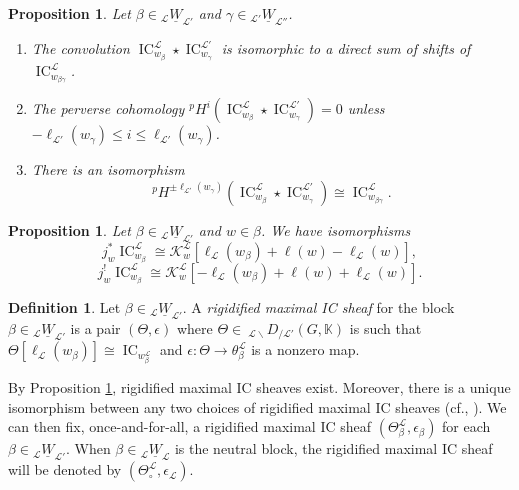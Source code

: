\documentclass{amsart}
\newcommand{\K}{\mathbb{K}}
\newcommand{\scrK}{\mathcal{K}}
\newcommand{\scrL}{\mathcal{L}}
\DeclareMathOperator{\IC}{IC}
\newcommand{\DEE}[2]{\:_{#1 \backslash} D_{/ #2} }
\newcommand{\uW}[2]{{}_{#1}\underline{W}_{#2}}
\newtheorem{proposition}[subsubsection]{Proposition}
\theoremstyle{definition}
\newtheorem{definition}[subsubsection]{Definition}
\numberwithin{equation}{subsection}
\begin{document}
\begin{proposition}\label{prop:conv_of_max_ICs}
    Let $\beta \in \uW{\scrL}{\scrL'}$ and $\gamma \in \uW{\scrL'}{\scrL''}$.
    \begin{enumerate}
        \item The convolution $\IC_{w_{\beta}}^{\scrL} \star \IC_{w_{\gamma}}^{\scrL'}$ is isomorphic to a direct sum of shifts of $\IC_{w_{\beta \gamma}}^{\scrL}$.
        \item The perverse cohomology ${}^p H^i \left( \IC_{w_{\beta}}^{\scrL} \star \IC_{w_{\gamma}}^{\scrL'} \right) = 0$ unless $-\ell_{\scrL'} (w_{\gamma}) \leq i \leq \ell_{\scrL'} (w_{\gamma})$.
        \item There is an isomorphism
        \[{}^p H^{\pm \ell_{\scrL'} (w_{\gamma})} \left( \IC_{w_{\beta}}^{\scrL} \star \IC_{w_{\gamma}}^{\scrL'} \right) \cong \IC_{w_{\beta \gamma}}^{\scrL}.\]
    \end{enumerate}
\end{proposition}

\begin{proposition}\label{prop:stalks_of_max_ICs}
    Let $\beta \in \uW{\scrL}{\scrL'}$ and $w \in \beta$. We have isomorphisms
    \[ j_w^* \IC_{w_{\beta}}^{\scrL} \cong \scrK_w^{\scrL} [\ell_{\scrL} (w_{\beta}) + \ell (w) - \ell_{\scrL} (w)],\]
    \[ j_w^! \IC_{w_{\beta}}^{\scrL} \cong \scrK_w^{\scrL} [-\ell_{\scrL} (w_{\beta}) + \ell (w) + \ell_{\scrL} (w)].\]
\end{proposition}

\begin{definition}
    Let $\beta \in \uW{\scrL}{\scrL'}$.
    A \emph{rigidified maximal IC sheaf} for the block $\beta \in \uW{\scrL}{\scrL'}$ is a pair $(\Theta, \epsilon)$ where $\Theta \in \DEE{\scrL}{\scrL'} (G, \K)$ is such that $\Theta [\ell_{\scrL} (w_{\beta})] \cong \IC_{w_{\beta}^{\scrL}}$ and $\epsilon : \Theta \to \theta_{\beta}^{\scrL}$ is a nonzero map.
\end{definition}

By Proposition \ref{prop:stalks_of_max_ICs}, rigidified maximal IC sheaves exist. 
Moreover, there is a unique isomorphism between any two choices of rigidified maximal IC sheaves (cf., \cite[6.5]{LY}).
We can then fix, once-and-for-all, a rigidified maximal IC sheaf $(\Theta^{\scrL}_{\beta}, \epsilon_{\beta})$ for each $\beta \in \uW{\scrL}{\scrL'}$. 
When $\beta \in \uW{\scrL}{\scrL}$ is the neutral block, the rigidified maximal IC sheaf will be denoted by $(\Theta_{\circ}^{\scrL}, \epsilon_{\scrL})$.
\end{document}
